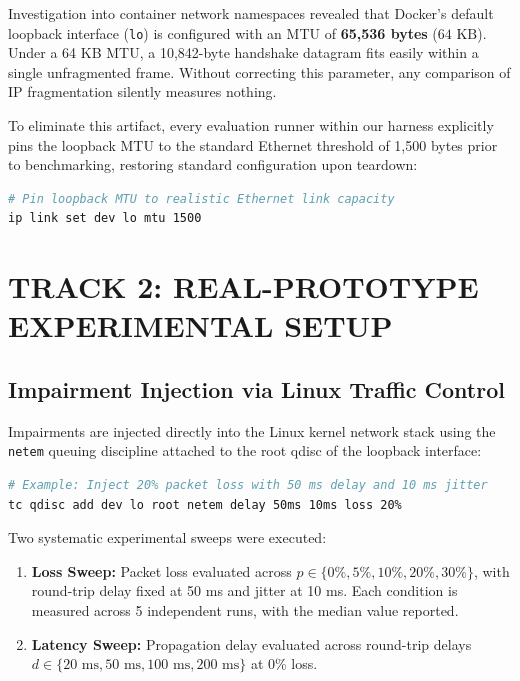 Investigation into container network namespaces revealed that Docker's default loopback interface (\texttt{lo}) is configured with an MTU of \textbf{65,536 bytes} ($64\text{ KB}$). Under a 64 KB MTU, a 10,842-byte handshake datagram fits easily within a single unfragmented frame. Without correcting this parameter, any comparison of IP fragmentation silently measures nothing.

To eliminate this artifact, every evaluation runner within our harness explicitly pins the loopback MTU to the standard Ethernet threshold of 1,500 bytes prior to benchmarking, restoring standard configuration upon teardown:
\begin{lstlisting}[language=bash]
# Pin loopback MTU to realistic Ethernet link capacity
ip link set dev lo mtu 1500
\end{lstlisting}

\section{TRACK 2: REAL-PROTOTYPE EXPERIMENTAL SETUP}

\subsection{Impairment Injection via Linux Traffic Control}
Impairments are injected directly into the Linux kernel network stack using the \texttt{netem} queuing discipline attached to the root qdisc of the loopback interface:
\begin{lstlisting}[language=bash]
# Example: Inject 20% packet loss with 50 ms delay and 10 ms jitter
tc qdisc add dev lo root netem delay 50ms 10ms loss 20%
\end{lstlisting}
Two systematic experimental sweeps were executed:
\begin{enumerate}
    \item \textbf{Loss Sweep:} Packet loss evaluated across $p \in \{0\%, 5\%, 10\%, 20\%, 30\%\}$, with round-trip delay fixed at 50 ms and jitter at 10 ms. Each condition is measured across 5 independent runs, with the median value reported.
    \item \textbf{Latency Sweep:} Propagation delay evaluated across round-trip delays $d \in \{20\text{ ms}, 50\text{ ms}, 100\text{ ms}, 200\text{ ms}\}$ at 0\% loss.
\end{enumerate}

